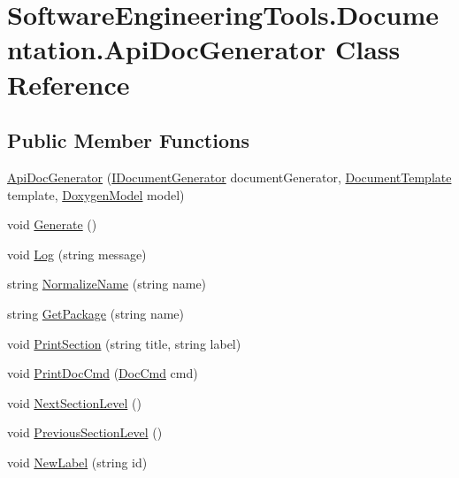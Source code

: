 \hypertarget{class_software_engineering_tools_1_1_documentation_1_1_api_doc_generator}{\section{Software\+Engineering\+Tools.\+Documentation.\+Api\+Doc\+Generator Class Reference}
\label{class_software_engineering_tools_1_1_documentation_1_1_api_doc_generator}
}
\subsection*{Public Member Functions}
\begin{DoxyCompactItemize}
\item 
\hyperlink{class_software_engineering_tools_1_1_documentation_1_1_api_doc_generator_af3563160ca4e416c41488c75d73535da}{Api\+Doc\+Generator} (\hyperlink{interface_software_engineering_tools_1_1_documentation_1_1_i_document_generator}{I\+Document\+Generator} document\+Generator, \hyperlink{class_software_engineering_tools_1_1_documentation_1_1_document_template}{Document\+Template} template, \hyperlink{class_software_engineering_tools_1_1_documentation_1_1_doxygen_model}{Doxygen\+Model} model)
\item 
void \hyperlink{class_software_engineering_tools_1_1_documentation_1_1_api_doc_generator_a2dc688a3ed6507a6d096a8892e86d154}{Generate} ()
\item 
void \hyperlink{class_software_engineering_tools_1_1_documentation_1_1_api_doc_generator_a6b66e322fd5d2c7362a6bcf6b472714d}{Log} (string message)
\item 
string \hyperlink{class_software_engineering_tools_1_1_documentation_1_1_api_doc_generator_a988cd7a92cb0eda5e917c648f53da41a}{Normalize\+Name} (string name)
\item 
string \hyperlink{class_software_engineering_tools_1_1_documentation_1_1_api_doc_generator_ad359ac0b2584664e99232093cbb2e749}{Get\+Package} (string name)
\item 
void \hyperlink{class_software_engineering_tools_1_1_documentation_1_1_api_doc_generator_a9e249f84ffd24e3052eb273b937d4847}{Print\+Section} (string title, string label)
\item 
void \hyperlink{class_software_engineering_tools_1_1_documentation_1_1_api_doc_generator_af58464eec9d1a29cf80b217f96ad3a38}{Print\+Doc\+Cmd} (\hyperlink{class_software_engineering_tools_1_1_documentation_1_1_doc_cmd}{Doc\+Cmd} cmd)
\item 
void \hyperlink{class_software_engineering_tools_1_1_documentation_1_1_api_doc_generator_a417b7c3d6e2fb7eaf96c5cc128693e1f}{Next\+Section\+Level} ()
\item 
void \hyperlink{class_software_engineering_tools_1_1_documentation_1_1_api_doc_generator_af71b89e5cacd5f0a6db62cc1989c56a5}{Previous\+Section\+Level} ()
\item 
void \hyperlink{class_software_engineering_tools_1_1_documentation_1_1_api_doc_generator_a04ede5421a322b9ae43bb067be59b527}{New\+Label} (string id)
\end{DoxyCompactItemize}
